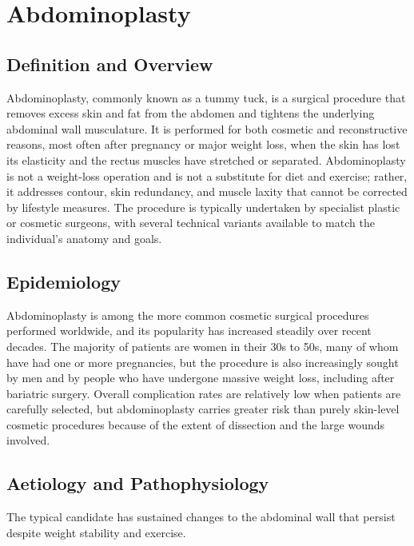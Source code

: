\chapter{Abdominoplasty}

\section*{Definition and Overview}
Abdominoplasty, commonly known as a tummy tuck, is a surgical procedure that removes excess skin and fat from the abdomen and tightens the underlying abdominal wall musculature. It is performed for both cosmetic and reconstructive reasons, most often after pregnancy or major weight loss, when the skin has lost its elasticity and the rectus muscles have stretched or separated. Abdominoplasty is not a weight-loss operation and is not a substitute for diet and exercise; rather, it addresses contour, skin redundancy, and muscle laxity that cannot be corrected by lifestyle measures. The procedure is typically undertaken by specialist plastic or cosmetic surgeons, with several technical variants available to match the individual's anatomy and goals.

\section*{Epidemiology}
Abdominoplasty is among the more common cosmetic surgical procedures performed worldwide, and its popularity has increased steadily over recent decades. The majority of patients are women in their 30s to 50s, many of whom have had one or more pregnancies, but the procedure is also increasingly sought by men and by people who have undergone massive weight loss, including after bariatric surgery. Overall complication rates are relatively low when patients are carefully selected, but abdominoplasty carries greater risk than purely skin-level cosmetic procedures because of the extent of dissection and the large wounds involved.

\section*{Aetiology and Pathophysiology}
The typical candidate has sustained changes to the abdominal wall that persist despite weight stability and exercise.

